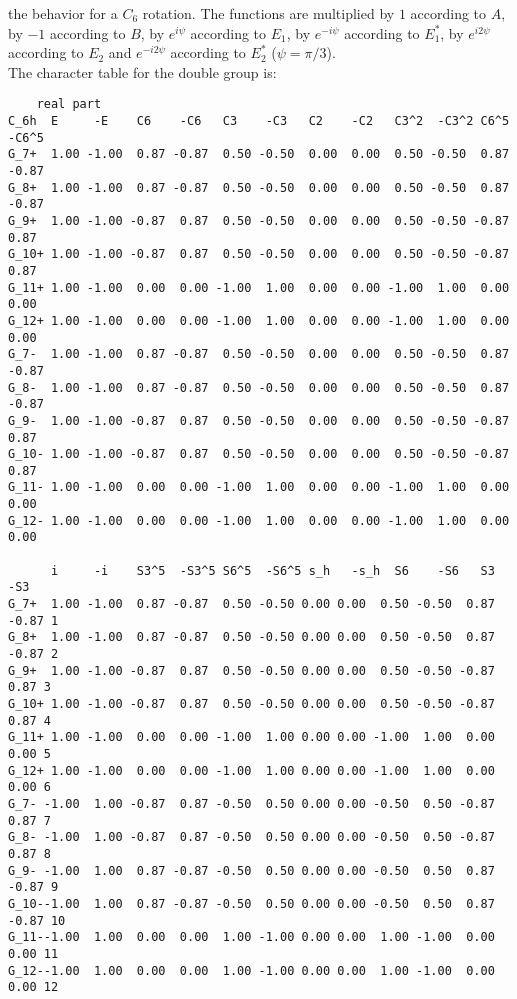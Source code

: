 \documentclass[12pt,a4paper]{article}
\begin{document}
the behavior for a $C_6$ rotation. The functions are multiplied by $1$
according to $A$, by $-1$ according to $B$, by $e^{i\psi}$ according to
$E_1$, by $e^{-i\psi}$ according to $E_1^*$, by $e^{i2 \psi}$ according to
$E_2$ and $e^{-i2 \psi}$ according to $E_2^*$ ($\psi=\pi/3$). \\
The character table for the double group is:
\begin{footnotesize}
\begin{verbatim}
    real part
C_6h  E     -E    C6    -C6   C3    -C3   C2    -C2   C3^2  -C3^2 C6^5  -C6^5
G_7+  1.00 -1.00  0.87 -0.87  0.50 -0.50  0.00  0.00  0.50 -0.50  0.87 -0.87
G_8+  1.00 -1.00  0.87 -0.87  0.50 -0.50  0.00  0.00  0.50 -0.50  0.87 -0.87
G_9+  1.00 -1.00 -0.87  0.87  0.50 -0.50  0.00  0.00  0.50 -0.50 -0.87  0.87
G_10+ 1.00 -1.00 -0.87  0.87  0.50 -0.50  0.00  0.00  0.50 -0.50 -0.87  0.87
G_11+ 1.00 -1.00  0.00  0.00 -1.00  1.00  0.00  0.00 -1.00  1.00  0.00  0.00
G_12+ 1.00 -1.00  0.00  0.00 -1.00  1.00  0.00  0.00 -1.00  1.00  0.00  0.00
G_7-  1.00 -1.00  0.87 -0.87  0.50 -0.50  0.00  0.00  0.50 -0.50  0.87 -0.87
G_8-  1.00 -1.00  0.87 -0.87  0.50 -0.50  0.00  0.00  0.50 -0.50  0.87 -0.87
G_9-  1.00 -1.00 -0.87  0.87  0.50 -0.50  0.00  0.00  0.50 -0.50 -0.87  0.87
G_10- 1.00 -1.00 -0.87  0.87  0.50 -0.50  0.00  0.00  0.50 -0.50 -0.87  0.87
G_11- 1.00 -1.00  0.00  0.00 -1.00  1.00  0.00  0.00 -1.00  1.00  0.00  0.00
G_12- 1.00 -1.00  0.00  0.00 -1.00  1.00  0.00  0.00 -1.00  1.00  0.00  0.00

      i     -i    S3^5  -S3^5 S6^5  -S6^5 s_h   -s_h  S6    -S6   S3    -S3
G_7+  1.00 -1.00  0.87 -0.87  0.50 -0.50 0.00 0.00  0.50 -0.50  0.87 -0.87 1
G_8+  1.00 -1.00  0.87 -0.87  0.50 -0.50 0.00 0.00  0.50 -0.50  0.87 -0.87 2
G_9+  1.00 -1.00 -0.87  0.87  0.50 -0.50 0.00 0.00  0.50 -0.50 -0.87  0.87 3
G_10+ 1.00 -1.00 -0.87  0.87  0.50 -0.50 0.00 0.00  0.50 -0.50 -0.87  0.87 4
G_11+ 1.00 -1.00  0.00  0.00 -1.00  1.00 0.00 0.00 -1.00  1.00  0.00  0.00 5
G_12+ 1.00 -1.00  0.00  0.00 -1.00  1.00 0.00 0.00 -1.00  1.00  0.00  0.00 6
G_7- -1.00  1.00 -0.87  0.87 -0.50  0.50 0.00 0.00 -0.50  0.50 -0.87  0.87 7
G_8- -1.00  1.00 -0.87  0.87 -0.50  0.50 0.00 0.00 -0.50  0.50 -0.87  0.87 8
G_9- -1.00  1.00  0.87 -0.87 -0.50  0.50 0.00 0.00 -0.50  0.50  0.87 -0.87 9
G_10--1.00  1.00  0.87 -0.87 -0.50  0.50 0.00 0.00 -0.50  0.50  0.87 -0.87 10
G_11--1.00  1.00  0.00  0.00  1.00 -1.00 0.00 0.00  1.00 -1.00  0.00  0.00 11
G_12--1.00  1.00  0.00  0.00  1.00 -1.00 0.00 0.00  1.00 -1.00  0.00  0.00 12


\end{verbatim}
\end{footnotesize}
\end{document}
